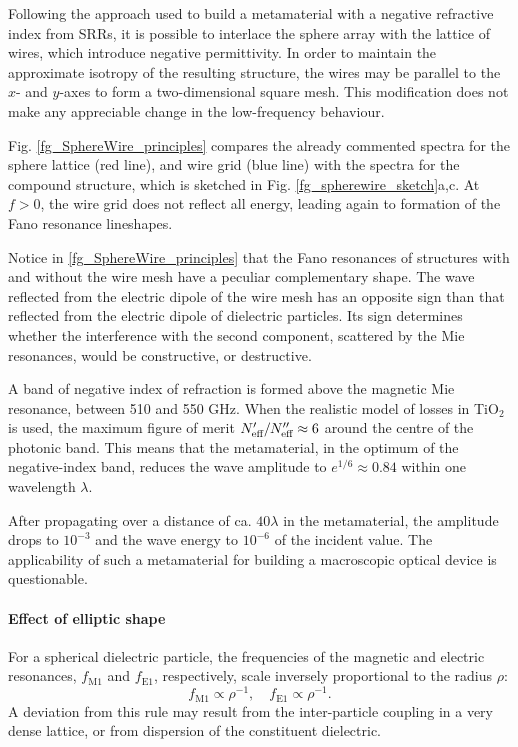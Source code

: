 Following the approach used to build a metamaterial with a negative refractive index from SRRs, it is possible to interlace the sphere array with the lattice of wires, which introduce negative permittivity. In order to maintain the approximate isotropy of the resulting structure, the wires may be parallel to the $x$- and $y$-axes to form a two-dimensional square mesh. This modification does not make any appreciable change in the low-frequency behaviour. %

Fig. \ref{fg_SphereWire_principles} compares the already commented spectra for the sphere lattice (red line), and wire grid (blue line) with the spectra for the compound structure, which is sketched in Fig. \ref{fg_spherewire_sketch}a,c. At $f>0$, the wire grid does not reflect all energy, leading again to formation of the Fano resonance lineshapes. 

Notice in \ref{fg_SphereWire_principles} that the Fano resonances of structures with and without the wire mesh have a peculiar complementary shape. The wave reflected from the electric dipole of the wire mesh has an opposite sign than that reflected from the electric dipole of dielectric particles. Its sign determines whether the interference with the second component, scattered by the Mie resonances, would be constructive, or destructive. 

A band of negative index of refraction is formed above the magnetic Mie resonance, between 510 and 550 GHz. When the realistic model of losses in TiO$_2$ is used, the maximum figure of merit $N_{\text{eff} }'/N_{\text{eff} }'' \approx 6$ around the centre of the photonic band. This means that the metamaterial, in the optimum of the negative-index band, reduces the wave amplitude to $e^{1/6} \approx 0.84$ within one wavelength $\lambda$. 

After propagating over a distance of ca. $40\lambda$ in the metamaterial, the amplitude drops to $10^{-3}$ and the wave energy to $10^{-6}$ of the incident value. The applicability of such a metamaterial for building a macroscopic optical device is questionable. %


\paragraph{Effect of elliptic shape}%
For a spherical dielectric particle, the frequencies of the magnetic and electric resonances, $f_{\text{M1}}$ and $f_{\text{E1}}$, respectively, scale inversely proportional to the radius $\rho$:
\begin{equation} f_{\text{M1}} \propto \rho^{-1}, \quad f_{\text{E1}} \propto \rho^{-1}. \label{eq_freq_rho}\end{equation}
A deviation from this rule may result from the inter-particle coupling in a very dense lattice, or from dispersion of the constituent dielectric.

